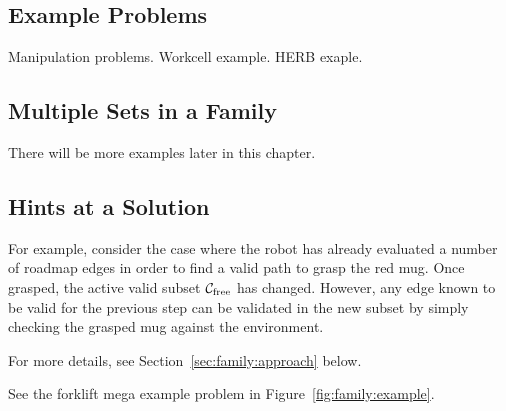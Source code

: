 \subsection{Example Problems}

Manipulation problems.
Workcell example.
HERB exaple.

\subsection{Multiple Sets in a Family}

There will be more examples later in this chapter.

\subsection{Hints at a Solution}

For example,
consider the case where the robot has already evaluated a number
of roadmap edges in order to find a valid path to grasp the red mug.
Once grasped, the active valid subset $\mathcal{C}_{\mbox{\scriptsize free}}$
has changed.
However,
any edge known to be valid for the previous step
can be validated in the new subset by simply checking the grasped
mug against the environment.

For more details, see Section~\ref{sec:family:approach} below.

See the forklift mega example problem
in Figure~\ref{fig:family:example}.

